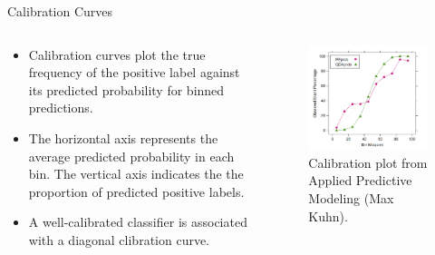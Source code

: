 \documentclass[11pt,compress,t,notes=noshow, xcolor=table]{beamer}
\begin{document}
\begin{frame}{Calibration Curves}

\begin{columns}

\begin{column}{0.5\textwidth}
\begin{itemize}
\setlength\itemsep{2em}
    \item Calibration curves plot the true frequency of the positive label against its predicted probability for binned predictions.
    \item The horizontal axis represents the average predicted probability in each bin. The vertical axis indicates the the proportion of predicted positive labels.
    \item A well-calibrated classifier is associated with a diagonal clibration curve.
\end{itemize}
\end{column}
\begin{column}{0.5\textwidth}
\begin{figure}
    \centering
    \includegraphics{figure/calibration_plot.png}
    \caption{Calibration plot from Applied Predictive Modeling (Max Kuhn).}
\end{figure}
\end{column}
\end{columns}

\end{frame}



\endlecture
\end{document}
